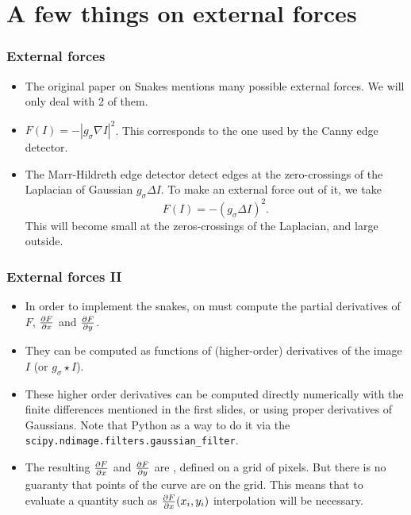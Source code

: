 \documentclass[10pt]{beamer}
\newcommand{\myemph}[1]{{\color{blue}{#1}}}
\begin{document}
\section{A few things on external forces}

\begin{frame}
  \frametitle{External forces}
  \begin{itemize}
  \item The original paper on Snakes mentions many possible external forces. We will only deal with 2 of them.
  \item $F(I) = -|g_\sigma\nabla I|^2$. This corresponds to the one used by the Canny edge detector.
  \item The Marr-Hildreth edge detector detect edges at the zero-crossings of the Laplacian of Gaussian $g_\sigma\Delta I$.
    To make an external force out of it, we take 
    $$
    F(I) = -\left(g_\sigma\Delta I\right)^2.
    $$
    This will become small at the zeros-crossings of the Laplacian, and large outside.
  \end{itemize}
\end{frame}

\begin{frame}
  \frametitle{External forces II}
  \begin{itemize}
\item In order to implement the snakes, on must compute the partial
    derivatives of $F$, $\frac{\partial{F}}{\partial{x}}$ and $\frac{\partial{F}}{\partial{y}}$. 
  \item They can be computed as functions of (higher-order)
    derivatives of the image $I$ (or $g_\sigma\star I$).
  \item These higher order derivatives can be computed directly
    numerically with the finite differences mentioned in the first
    slides, or using proper derivatives of Gaussians. Note that Python
    as a way to do it via the
    \texttt{scipy.ndimage.filters.gaussian\_filter}.
  \item The resulting $\frac{\partial{F}}{\partial{x}}$ and $\frac{\partial{F}}{\partial{y}}$ are
    \myemph{images}, defined on a grid of pixels. But there is no
    guaranty that points of the curve are on the grid. This means that
    to evaluate a quantity such as $\frac{\partial{F}}{\partial{x}}(x_i,y_i)$
    interpolation will be necessary.
  \end{itemize}
\end{frame}
\end{document}
